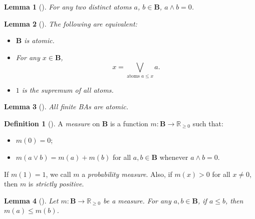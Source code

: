 \documentclass{article}
\newtheorem{lemma}{Lemma}
\theoremstyle{definition}
\newtheorem{definition}{Definition}
\theoremstyle{remark}
\begin{document}
\begin{lemma}[\cite{ganesh2006introduction}]
  For any two distinct atoms $a$, $b \in \mathbf{B}$, $a \land b = 0$.
\end{lemma}

\begin{lemma}[\cite{givant2008introduction}] \label{thm:representation}
  The following are equivalent:
  \begin{itemize}
  \item $\mathbf{B}$ is atomic.
  \item For any $x \in \mathbf{B}$,
    \[
      x = \bigvee_{\text{atoms } a \le x} a.
    \]
  \item $1$ is the supremum of all atoms.
  \end{itemize}
\end{lemma}

\begin{lemma}[\cite{givant2008introduction}] \label{lemma:atomic}
  All finite BAs are atomic.
\end{lemma}

\begin{definition}[\cite{gaifman1964concerning,DBLP:books/daglib/0090259}] \label{def:measure}
  A \emph{measure} on $\mathbf{B}$ is a function $m\colon
  \mathbf{B} \to \mathbb{R}_{\ge 0}$ such that:
  \begin{itemize}
  \item $m(0) = 0$;
  \item $m(a \lor b) = m(a) + m(b)$ for all $a, b \in \mathbf{B}$ whenever $a
    \land b = 0$.
  \end{itemize}
  If $m(1) = 1$, we call $m$ a \emph{probability measure}. Also, if $m(x) > 0$
  for all $x \ne 0$, then $m$ is \emph{strictly positive}.
\end{definition}

\begin{lemma}[\cite{horn1948measures}] \label{lemma:m_and_order}
  Let $m: \mathbf{B} \to \mathbb{R}_{\ge 0}$ be a measure. For any $a, b \in
  \mathbf{B}$, if $a \le b$, then $m(a) \le m(b)$.
\end{lemma}
\end{document}
